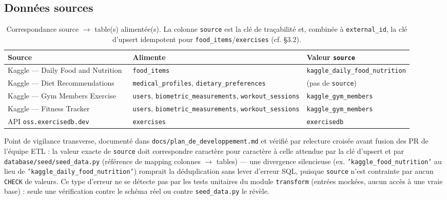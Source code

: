 \documentclass{article}
\begin{document}
\subsection{Données sources}

\begin{table}[H]
\centering
\small
\begin{tabularx}{\textwidth}{@{}p{3.4cm} X l@{}}
\toprule
\textbf{Source} & \textbf{Alimente} & \textbf{Valeur \texttt{source}} \\
\midrule
Kaggle — Daily Food and Nutrition~\citep{kaggle_nutrition} & \texttt{food\_items} & \texttt{kaggle\_\allowbreak daily\_\allowbreak food\_\allowbreak nutrition} \\
Kaggle — Diet Recommendations~\citep{kaggle_diet} & \texttt{medical\_profiles}, \texttt{dietary\_preferences} & (pas de \texttt{source}) \\
Kaggle — Gym Members Exercise~\citep{kaggle_gym} & \texttt{users}, \texttt{biometric\_measurements}, \texttt{workout\_sessions} & \texttt{kaggle\_\allowbreak gym\_\allowbreak members} \\
Kaggle — Fitness Tracker~\citep{kaggle_fitness} & \texttt{users}, \texttt{biometric\_measurements}, \texttt{workout\_sessions} & \texttt{kaggle\_\allowbreak gym\_\allowbreak members} \\
API \texttt{oss.exercisedb.dev}~\citep{exercisedb} & \texttt{exercises} & \texttt{exercisedb} \\
\bottomrule
\end{tabularx}
\caption{Correspondance source $\rightarrow$ table(s) alimentée(s). La colonne \texttt{source} est la clé de traçabilité et, combinée à \texttt{external\_id}, la clé d'upsert idempotent pour \texttt{food\_items}/\texttt{exercises} (cf. \S3.2).}
\end{table}

Point de vigilance transverse, documenté dans \texttt{docs/plan\_de\_developpement.md} et vérifié par relecture croisée avant fusion des PR de l'équipe ETL : la valeur exacte de \texttt{source} doit correspondre caractère pour caractère à celle attendue par la clé d'upsert et par \texttt{database/seed/seed\_data.py} (référence de mapping colonnes $\rightarrow$ tables) — une divergence silencieuse (ex. \texttt{'kaggle\_food\_nutrition'} au lieu de \texttt{'kaggle\_daily\_food\_nutrition'}) romprait la déduplication sans lever d'erreur SQL, puisque \texttt{source} n'est contrainte par aucun \texttt{CHECK} de valeurs. Ce type d'erreur ne se détecte pas par les tests unitaires du module \texttt{transform} (entrées mockées, aucun accès à une vraie base) : seule une vérification contre le schéma réel ou contre \texttt{seed\_data.py} le révèle.
\end{document}
